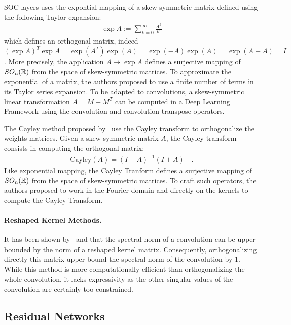 SOC layers uses the expontial mapping of a skew symmetric matrix defined using the following Taylor expansion:
\begin{align*}
  \exp{A}:=\sum_{k=0}^{\infty}\frac{A^k}{k!}
\end{align*}
which defines an orthogonal matrix, indeed $(\exp{A})^T\exp{A} = \exp(A^T)\exp(A) = \exp(-A)\exp(A) = \exp(A-A)=I$ . More precisely, the application $A\mapsto\exp{A}$ defines a surjective mapping of $SO_n(\mathbb{R})$ from the space of skew-symmetric matrices. To approximate the exponential of a matrix, the authors proposed to use a finite number of terms in its Taylor series expansion.  To be adapted to convolutions, a skew-symmetric linear transformation $A = M-M^T$ can be  computed in a Deep Learning Framework using the  convolution and convolution-transpose operators.



The Cayley method proposed by~\citet{trockman2021orthogonalizing} use the Cayley transform to orthogonalize the weights matrices. Given a skew symmetric matrix $A$, the Cayley transform consists in computing the orthogonal matrix:
\begin{align*}
   \text{Cayley}(A)= (I - A)^{-1} (I + A) \quad.
\end{align*}
Like exponential mapping, the Cayley Tranform defines  a surjective mapping of $SO_n(\mathbb{R})$ from the space of skew-symmetric matrices. To craft such operators, the authors proposed to work in the Fourier domain and directly on the kernels to compute the Cayley Transform.

\paragraph{Reshaped Kernel Methods.}
It has been shown by~\citet{cisse2017parseval} and \citet{tsuzuku2018lipschitz} that the spectral norm of a convolution can be upper-bounded by the norm of a reshaped kernel matrix. Consequently, orthogonalizing directly this matrix upper-bound the spectral norm of the convolution by $1$.
While this method is more computationally efficient than orthogonalizing the whole convolution, it lacks expressivity as the other singular values of the convolution are certainly too constrained. 



\subsection{Residual Networks}


